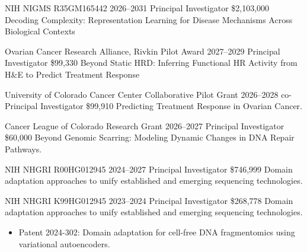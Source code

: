 
\grant
  {NIH NIGMS R35GM165442}
  {2026--2031}
  {Principal Investigator}
  {\$2,103,000}
  {Decoding Complexity: Representation Learning for Disease Mechanisms Across Biological Contexts}

\grant
  {Ovarian Cancer Research Alliance, Rivkin Pilot Award}
  {2027--2029}
  {Principal Investigator}
  {\$99,330}
  {Beyond Static HRD: Inferring Functional HR Activity from H\&E to Predict Treatment Response}

\grant
  {University of Colorado Cancer Center Collaborative Pilot Grant}
  {2026--2028}
  {co-Principal Investigator}
  {\$99,910}
  {Predicting Treatment Response in Ovarian Cancer.}

\grant
  {Cancer League of Colorado Research Grant}
  {2026--2027}
  {Principal Investigator}
  {\$60,000}
  {Beyond Genomic Scarring: Modeling Dynamic Changes in DNA Repair Pathways.}

\grant
  {NIH NHGRI R00HG012945}
  {2024--2027}
  {Principal Investigator}
  {\$746,999}
  {Domain adaptation approaches to unify established and emerging sequencing technologies.}

\grant
  {NIH NHGRI K99HG012945}
  {2023--2024}
  {Principal Investigator}
  {\$268,778}
  {Domain adaptation approaches to unify established and emerging sequencing technologies.}

\begin{itemize}
  \item Patent 2024-302: Domain adaptation for cell-free DNA fragmentomics using variational autoencoders.
\end{itemize}